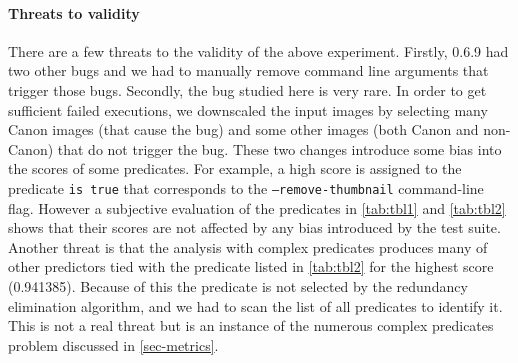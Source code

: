 
\paragraph{Threats to validity}
There are a few threats to the validity of the above experiment.  Firstly,  0.6.9 had two other bugs and we had to manually remove command line arguments that trigger those bugs.  Secondly, the bug studied here is very rare.  In order to get sufficient failed executions, we downscaled the input images by selecting many Canon images (that cause the bug) and some other images (both Canon and non-Canon) that do not trigger the bug.  These two changes introduce some bias into the scores of some predicates.  For example, a high score is assigned to the predicate  \texttt{is true} that corresponds to the \texttt{---remove-thumbnail} command-line flag.  However a subjective evaluation of the predicates in \autoref{tab:tbl1} and \autoref{tab:tbl2} shows that their scores are not affected by any bias introduced by the test suite.  Another threat is that the analysis with complex predicates produces many of other predictors tied with the predicate listed in \autoref{tab:tbl2} for the highest score (0.941385).  Because of this the predicate is not selected by the redundancy elimination algorithm, and we had to scan the list of all predicates to identify it.  This is not a real threat but is an instance of the numerous complex predicates problem discussed in \autoref{sec-metrics}.


